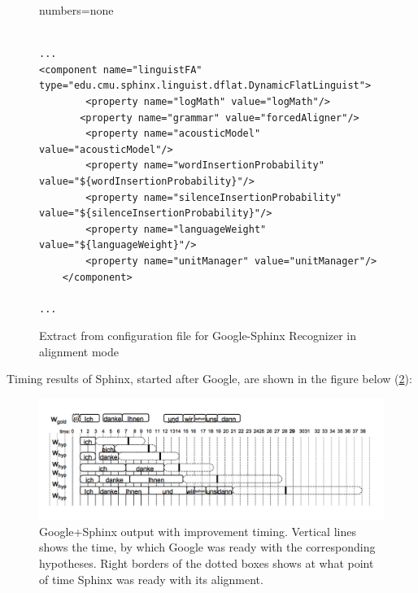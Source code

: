 \begin{figure}[htbp]
  \centering 
 
{numbers=none}  
\lstset{language=XML} 
\begin{lstlisting}[style=nonumbers]

...
<component name="linguistFA" type="edu.cmu.sphinx.linguist.dflat.DynamicFlatLinguist">  
        <property name="logMath" value="logMath"/>
       <property name="grammar" value="forcedAligner"/>   
        <property name="acousticModel" value="acousticModel"/>
        <property name="wordInsertionProbability" value="${wordInsertionProbability}"/>
        <property name="silenceInsertionProbability" value="${silenceInsertionProbability}"/>
        <property name="languageWeight" value="${languageWeight}"/>
        <property name="unitManager" value="unitManager"/>
    </component>

...
\end{lstlisting}
 \caption{Extract from configuration file for Google-Sphinx Recognizer in
 alignment mode}
  \label{fig:conf_al}
\end {figure}

Timing results of Sphinx, started after Google, are shown in the figure below
(\ref{fig:conf_al_timing}):
\begin{figure}[htbp]
  \centering
    \includegraphics[width=1.0\textwidth]{images/google_sphinx_output_al.png}
 \caption{Google+Sphinx output with improvement timing. Vertical lines shows
 the time, by which Google was ready with the corresponding hypotheses.
 Right borders of the dotted boxes shows at what point of time Sphinx was ready
 with its alignment.}
  \label{fig:conf_al_timing}
\end {figure}

